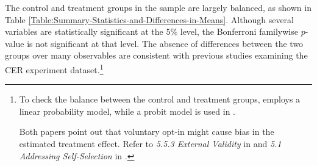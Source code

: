 The control and treatment groups in the sample are largely balanced, as shown in Table \ref{Table:Summary-Statistics-and-Differences-in-Means}. Although several variables are statistically significant at the 5\% level, the Bonferroni familywise $p$-value is not significant at that level. The absence of differences between the two groups over many observables are consistent with previous studies examining the CER experiment dataset.\footnote{To check the balance between the control and treatment groups, \cite{Peaking-Interest:How-Awareness-Drives-the-Effectiveness-of-Time-of-Use-Electricity-Pricing_Prest_2020} employs a linear probability model, while a probit model is used in \cite{The-Effect-of-Information-on-TOU-Electricity-Use:An-Irish-Residential-Study_Pon_2017}. \par
Both papers point out that voluntary opt-in might cause bias in the estimated treatment effect. Refer to \textit{5.5.3 External Validity} in \cite{Peaking-Interest:How-Awareness-Drives-the-Effectiveness-of-Time-of-Use-Electricity-Pricing_Prest_2020} and \textit{5.1 Addressing Self-Selection} in \cite{The-Effect-of-Information-on-TOU-Electricity-Use:An-Irish-Residential-Study_Pon_2017}. } 
